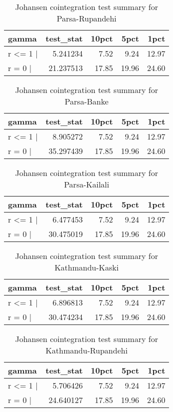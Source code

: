 \documentclass[12pt,]{article}
\begin{document}
\begin{longtable}[t]{lrrrr}
\caption{\label{tab:rice-cajo-test}Johansen cointegration test summary for Parsa-Rupandehi}\\
\toprule
gamma & test\_stat & 10pct & 5pct & 1pct\\
\midrule
r <= 1 | & 5.241234 & 7.52 & 9.24 & 12.97\\
r = 0  | & 21.237513 & 17.85 & 19.96 & 24.60\\
\bottomrule
\end{longtable}

\begin{longtable}[t]{lrrrr}
\caption{\label{tab:rice-cajo-test}Johansen cointegration test summary for Parsa-Banke}\\
\toprule
gamma & test\_stat & 10pct & 5pct & 1pct\\
\midrule
r <= 1 | & 8.905272 & 7.52 & 9.24 & 12.97\\
r = 0  | & 35.297439 & 17.85 & 19.96 & 24.60\\
\bottomrule
\end{longtable}

\begin{longtable}[t]{lrrrr}
\caption{\label{tab:rice-cajo-test}Johansen cointegration test summary for Parsa-Kailali}\\
\toprule
gamma & test\_stat & 10pct & 5pct & 1pct\\
\midrule
r <= 1 | & 6.477453 & 7.52 & 9.24 & 12.97\\
r = 0  | & 30.475019 & 17.85 & 19.96 & 24.60\\
\bottomrule
\end{longtable}

\begin{longtable}[t]{lrrrr}
\caption{\label{tab:rice-cajo-test}Johansen cointegration test summary for Kathmandu-Kaski}\\
\toprule
gamma & test\_stat & 10pct & 5pct & 1pct\\
\midrule
r <= 1 | & 6.896813 & 7.52 & 9.24 & 12.97\\
r = 0  | & 30.474234 & 17.85 & 19.96 & 24.60\\
\bottomrule
\end{longtable}

\begin{longtable}[t]{lrrrr}
\caption{\label{tab:rice-cajo-test}Johansen cointegration test summary for Kathmandu-Rupandehi}\\
\toprule
gamma & test\_stat & 10pct & 5pct & 1pct\\
\midrule
r <= 1 | & 5.706426 & 7.52 & 9.24 & 12.97\\
r = 0  | & 24.640127 & 17.85 & 19.96 & 24.60\\
\bottomrule
\end{longtable}
\end{document}

